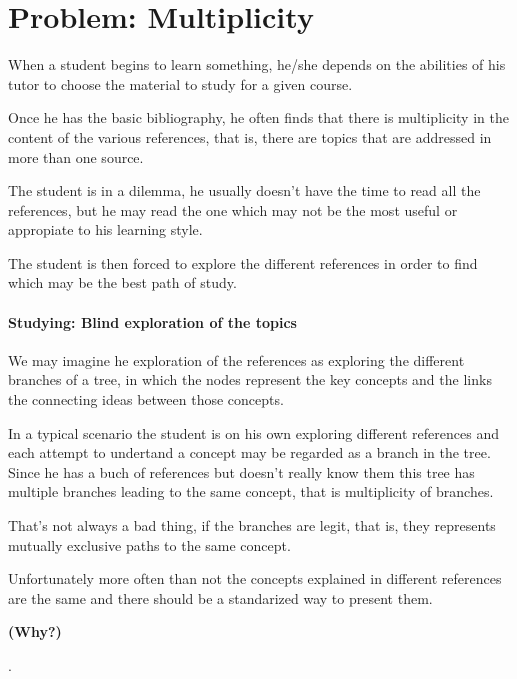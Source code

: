 \section{Problem: Multiplicity}
\label{multiplicity}
\indent
 When a student begins to learn something, he/she
 depends on the abilities of his tutor to choose the 
 material to study for a given course.
 \par
 
 \indent
 Once he has the basic bibliography, he often finds
 that there is multiplicity in the content of the 
 various references, that is, there are topics that
 are addressed in more than one source.
 \par
 
 \indent
 The student is in a dilemma, he usually doesn't
 have the time to read all the references, but he
 may read the one which may not be the most useful 
 or appropiate to his learning style.
 \par
 
 \indent
 The student is then forced to explore the different
 references in order to find which may be the best 
 path of study.
 \par



\paragraph{Studying: Blind exploration of the topics}

\indent
We may imagine he exploration of the references as 
exploring the different branches of a tree, in which 
the nodes represent the key concepts and the links 
the connecting ideas between those concepts.
\par

\indent
In a typical scenario the student is on his own exploring 
different references and each attempt to undertand a concept
may be regarded as a branch in the tree. Since he has a 
buch of references but doesn't really know them this tree 
has multiple branches leading to the same concept, that 
is multiplicity of branches. 
\par

\indent
That's not always a bad thing, if the branches are legit, that
is, they represents mutually exclusive paths to the same concept.
\par

\indent
Unfortunately more often than not the concepts explained in 
different references are the same and there should be a standarized
way to present them. 
\begin{Large}\textbf{(Why?)}\end{Large}.
\par

